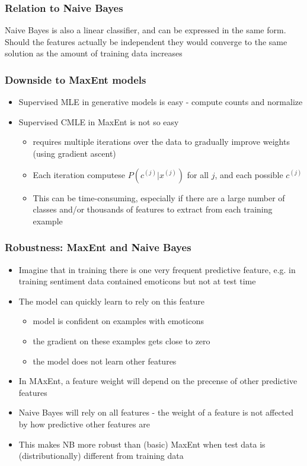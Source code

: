 \documentclass[landscape, 8pt]{extarticle}
\begin{document}
\begin{multicols}{3}
\subsubsection{Relation to Naive Bayes}
Naive Bayes is also a linear classifier, and can be expressed in the same form. Should the features actually be independent they would converge to the same solution as the amount of training data increases

\subsubsection{Downside to MaxEnt models}
\begin{itemize}
    \setlength\itemsep{0em}
    \item Supervised MLE in generative models is easy - compute counts and normalize
    \item Supervised CMLE in MaxEnt is not so easy
        \begin{itemize}
            \setlength\itemsep{0em}
            \item requires multiple iterations over the data to gradually improve weights (using gradient ascent)
            \item Each iteration computese $P(c^{(j)} | x^{(j)})$ for all $j$, and each possible $c^{(j)}$
            \item This can be time-consuming, especially if there are a large number of classes and/or thousands of features to extract from each training example
        \end{itemize}
\end{itemize}

\subsubsection{Robustness: MaxEnt and Naive Bayes}
\begin{itemize}
    \setlength\itemsep{0em}
    \item Imagine that in training there is one very frequent predictive feature, e.g. in training sentiment data contained emoticons but not at test time
    \item The model can quickly learn to rely on this feature
        \begin{itemize}
            \setlength\itemsep{0em}
            \item model is confident on examples with emoticons
            \item the gradient on these examples gets close to zero
            \item the model does not learn other features
        \end{itemize}
    \item In MAxEnt, a feature weight will depend on the precense of other predictive features
    \item Naive Bayes will rely on all features - the weight of a feature is not affected by how predictive other features are
    \item This makes NB more robust than (basic) MaxEnt when test data is (distributionally) different from training data
\end{itemize}


\end{multicols}
\end{document}
